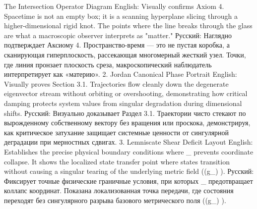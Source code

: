 The Intersection Operator Diagram
English: Visually confirms Axiom 4. Spacetime is not an empty box; it is a scanning hyperplane slicing through a higher-dimensional rigid knot. The points where the line breaks through the glass are what a macroscopic observer interprets as "matter."  
Русский: Наглядно подтверждает Аксиому 4. Пространство-время — это не пустая коробка, а сканирующая гиперплоскость, рассекающая многомерный жесткий узел. Точки, где линия пронзает плоскость среза, макроскопический наблюдатель интерпретирует как «материю».  
2. Jordan Canonical Phase Portrait
English: Visually proves Section 3.1. Trajectories flow cleanly down the degenerate eigenvector stream without orbiting or overshooting, demonstrating how critical damping protects system values from singular degradation during dimensional shifts.  
Русский: Визуально доказывает Раздел 3.1. Траектории чисто стекают по вырожденному собственному вектору без вращения или проскока, демонстрируя, как критическое затухание защищает системные ценности от сингулярной деградации при мерностных сдвигах.  
3. Lemniscate Shear Deficit Layout
English: Establishes the precise physical boundary conditions where \delta_{}  prevents coordinate collapse. It shows the localized state transfer point where states transition without causing a singular tearing of the underlying metric field (\det(g_{\mu\nu}) ).  
Русский: Фиксирует точные физические граничные условия, при которых \delta_{}  предотвращает коллапс координат. Показана локализованная точка передачи, где состояния переходят без сингулярного разрыва базового метрического поля (\det(g_{\mu\nu}) ).  
